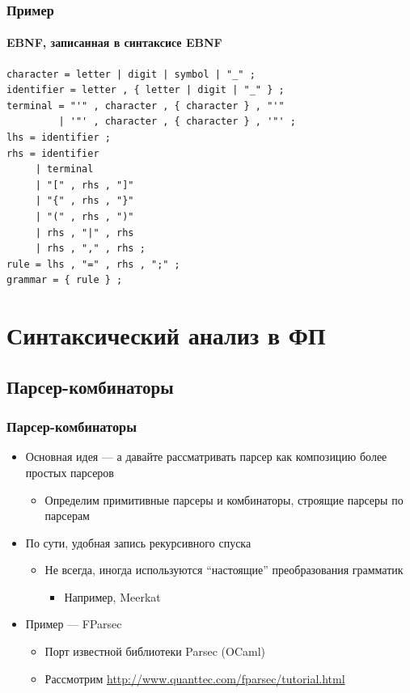 \documentclass[xetex,mathserif,serif]{beamer}
\begin{document}
    \begin{frame}[fragile]
        \frametitle{Пример}
        \framesubtitle{EBNF, записанная в синтаксисе EBNF}
        \begin{footnotesize}
            \begin{verbatim}
character = letter | digit | symbol | "_" ;
identifier = letter , { letter | digit | "_" } ;
terminal = "'" , character , { character } , "'" 
         | '"' , character , { character } , '"' ;
lhs = identifier ;
rhs = identifier
     | terminal
     | "[" , rhs , "]"
     | "{" , rhs , "}"
     | "(" , rhs , ")"
     | rhs , "|" , rhs
     | rhs , "," , rhs ;
rule = lhs , "=" , rhs , ";" ;
grammar = { rule } ;
            \end{verbatim}
        \end{footnotesize}
    \end{frame}

    \section{Синтаксический анализ в ФП}

    \subsection{Парсер-комбинаторы}

    \begin{frame}
        \frametitle{Парсер-комбинаторы}
        \begin{itemize}
            \item Основная идея --- а давайте рассматривать парсер как композицию более простых парсеров
            \begin{itemize}
                \item Определим примитивные парсеры и комбинаторы, строящие парсеры по парсерам
            \end{itemize}
            \item По сути, удобная запись рекурсивного спуска
            \begin{itemize}
                \item Не всегда, иногда используются ``настоящие'' преобразования грамматик
                \begin{itemize}
                    \item Например, Meerkat
                \end{itemize}
            \end{itemize}
            \item Пример --- FParsec
            \begin{itemize}
                \item Порт известной библиотеки Parsec (OCaml)
                \item Рассмотрим \url{http://www.quanttec.com/fparsec/tutorial.html}
            \end{itemize}
        \end{itemize}
    \end{frame}
\end{document}
